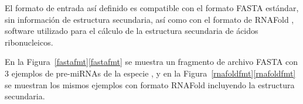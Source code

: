 El formato de entrada así definido es compatible con el formato FASTA
estándar, sin información de estructura secundaria, así como con el
formato de RNAFold \cite{vienna}, software utilizado para el cálculo
de la estructura secundaria de ácidos ribonucleicos.

En la \iflatexml{}Figura~\ref{fastafmt}\else\autoref{fastafmt}\fi{} se
muestra un fragmento de archivo FASTA con 3 ejemplos de pre-miRNAs de
la especie , y en la
\iflatexml{}Figura~\ref{rnafoldfmt}\else\autoref{rnafoldfmt}\fi{} se
muestran los mismos ejemplos con formato RNAFold incluyendo la
estructura secundaria.

